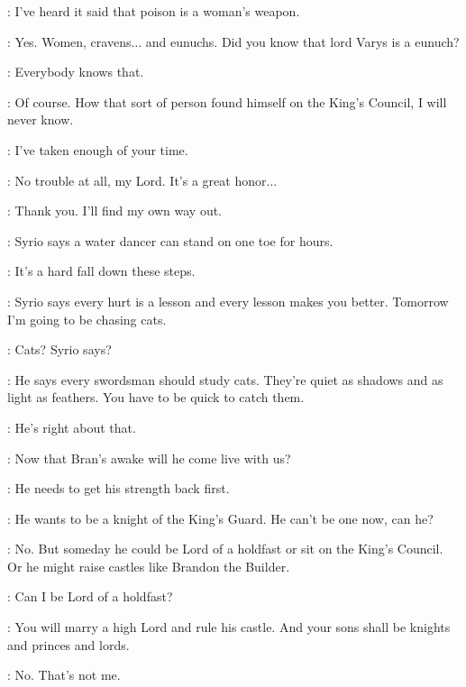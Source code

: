 \NED: I've heard it said that poison is a woman's weapon. 

\PYCELLE: Yes. Women, cravens$\ldots$ and eunuchs. Did you know that lord Varys is a eunuch? 

\NED: Everybody knows that. 

\PYCELLE: Of course. How that sort of person found himself on the King's Council, I will never know. 

\NED: I've taken enough of your time. 

\PYCELLE: No trouble at all, my Lord. It's a great honor$\ldots$ 

\NED: Thank you. I'll find my own way out. 

\scene



\ARYA: Syrio says a water dancer can stand on one toe for hours. 

\NED: It's a hard fall down these steps. 

\ARYA: Syrio says every hurt is a lesson and every lesson makes you better. Tomorrow I'm going to be chasing cats. 

\NED: Cats? Syrio says? 

\ARYA: He says every swordsman should study cats. They're quiet as shadows and as light as feathers. You have to be quick to catch them. 

\NED: He's right about that. 

\ARYA: Now that Bran's awake will he come live with us? 

\NED: He needs to get his strength back first. 

\ARYA: He wants to be a knight of the King's Guard. He can't be one now, can he? 

\NED: No. But someday he could be Lord of a holdfast or sit on the King's Council. Or he might raise castles like Brandon the Builder. 

\ARYA: Can I be Lord of a holdfast? 

\NED: You will marry a high Lord and rule his castle. And your sons shall be knights and princes and lords. 

\ARYA: No. That's not me. 

\scene



